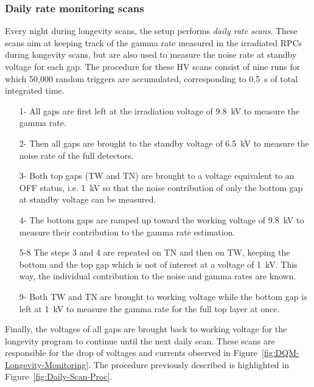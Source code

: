 \newpage
	
		\subsubsection{Daily rate monitoring scans}
		\label{chapt5:sssec:dailyratescan}
	
	Every night during longevity scans, the setup performs \textit{daily rate scans}. These scans aim at keeping track of the gamma rate measured in the irradiated RPCs during longevity scans, but are also used to measure the noise rate at standby voltage for each gap. The procedure for these HV scans consist of nine runs for which 50,000 random triggers are accumulated, corresponding to \SI{0.5}{s} of total integrated time.
	
	\begin{itemize}
		\item[1-] All gaps are first left at the irradiation voltage of \SI{9.8}{kV} to measure the gamma rate.
		\item[2-] Then all gaps are brought to the standby voltage of \SI{6.5}{kV} to measure the noise rate of the full detectors.
		\item[3-] Both top gaps (TW and TN) are brought to a voltage equivalent to an OFF status, i.e. \SI{1}{kV} so that the noise contribution of only the bottom gap at standby voltage can be measured.
		\item[4-] The bottom gaps are ramped up toward the working voltage of \SI{9.8}{kV} to measure their contribution to the gamma rate estimation.
		\item[5-8] The steps 3 and 4 are repeated on TN and then on TW, keeping the bottom and the top gap which is not of interest at a voltage of \SI{1}{kV}. This way, the individual contribution to the noise and gamma rates are known.
		\item[9-] Both TW and TN are brought to working voltage while the bottom gap is left at \SI{1}{kV} to measure the gamma rate for the full top layer at once.
	\end{itemize}
	
	Finally, the voltages of all gaps are brought back to working voltage for the longevity program to continue until the next daily scan. These scans are responsible for the drop of voltages and currents observed in Figure~\ref{fig:DQM-Longevity-Monitoring}. The procedure previously described is highlighted in Figure~\ref{fig:Daily-Scan-Proc}. 
	
